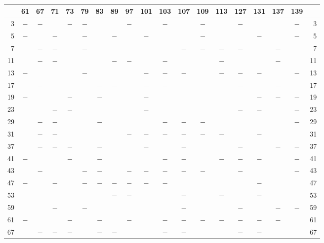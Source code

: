 \begin{center}\begingroup\fontsize{8}{10.5}\selectfont\setlength{\tabcolsep}{2pt}
\begin{tabular}{r|c|c|c|c|c|c|c|c|c|c|c|c|c|c|c|c|c|r}
\hline
 & 61 & 67 & 71 & 73 & 79 & 83 & 89 & 97 & 101 & 103 & 107 & 109 & 113 & 127 & 131 & 137 & 139 & \\
\hline
3 & $-$ & $-$ &  & $-$ & $-$ &  &  & $-$ &  & $-$ &  & $-$ &  & $-$ &  &  & $-$ & 3\\
5 & $-$ &  & $-$ &  & $-$ &  & $-$ &  & $-$ &  &  & $-$ &  &  & $-$ &  & $-$ & 5\\
7 &  & $-$ & $-$ &  & $-$ &  &  &  &  &  & $-$ & $-$ & $-$ & $-$ &  & $-$ &  & 7\\
11 &  & $-$ & $-$ &  &  &  & $-$ & $-$ &  & $-$ &  &  & $-$ &  &  & $-$ &  & 11\\
13 & $-$ &  &  &  & $-$ &  &  &  & $-$ & $-$ & $-$ &  & $-$ & $-$ & $-$ &  & $-$ & 13\\
17 &  & $-$ &  &  &  & $-$ & $-$ &  & $-$ & $-$ &  &  &  & $-$ &  & $-$ &  & 17\\
19 & $-$ &  &  & $-$ &  & $-$ &  &  & $-$ &  &  &  &  &  & $-$ & $-$ & $-$ & 19\\
23 &  &  & $-$ & $-$ &  &  &  &  & $-$ &  &  &  &  & $-$ & $-$ &  & $-$ & 23\\
29 &  & $-$ & $-$ &  &  & $-$ &  &  &  & $-$ & $-$ & $-$ &  &  &  &  & $-$ & 29\\
31 &  & $-$ & $-$ &  &  &  &  & $-$ & $-$ & $-$ & $-$ & $-$ & $-$ &  & $-$ &  &  & 31\\
37 &  & $-$ & $-$ & $-$ &  & $-$ &  &  & $-$ &  & $-$ &  &  & $-$ &  & $-$ & $-$ & 37\\
41 & $-$ &  &  & $-$ &  & $-$ &  &  &  & $-$ & $-$ &  & $-$ & $-$ & $-$ &  & $-$ & 41\\
43 &  & $-$ &  &  & $-$ & $-$ &  & $-$ & $-$ & $-$ & $-$ & $-$ &  & $-$ &  &  & $-$ & 43\\
47 & $-$ &  & $-$ &  & $-$ & $-$ & $-$ & $-$ & $-$ & $-$ &  &  &  &  & $-$ &  &  & 47\\
53 &  &  &  &  &  &  & $-$ & $-$ &  &  & $-$ &  & $-$ &  & $-$ &  &  & 53\\
59 &  &  & $-$ &  & $-$ &  &  &  &  &  & $-$ &  &  & $-$ &  & $-$ & $-$ & 59\\
61 & $-$ &  &  & $-$ &  & $-$ &  & $-$ &  & $-$ & $-$ & $-$ & $-$ & $-$ & $-$ & $-$ &  & 61\\
67 &  & $-$ & $-$ & $-$ &  & $-$ & $-$ &  &  & $-$ & $-$ &  &  & $-$ & $-$ &  &  & 67\\

\end{tabular}
\end{center}
